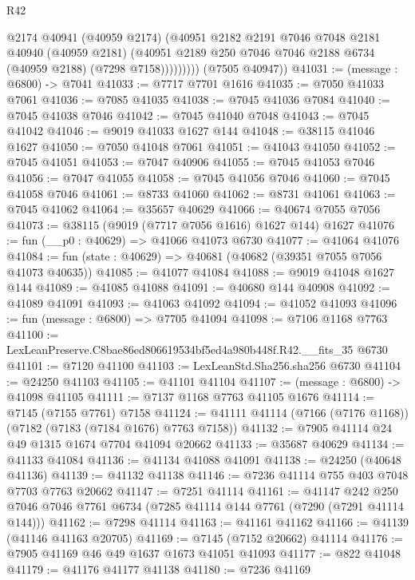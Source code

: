 \begin{lexlean}{R42}
\begin{coremodule}
{                  @2174
                  @40941
                  (@40959 @2174)
                  (@40951
                    @2182
                    @2191
                    @7046
                    @7048
                    @2181
                    @40940
                    (@40959 @2181)
                    (@40951 @2189 @250 @7046 @7046 @2188 @6734 (@40959 @2188) (@7298 @7158)))))))))
      (@7505 @40947))
@41031 := (message : @6800) -> @7041
@41033 := @7717 @7701 @1616
@41035 := @7050 @41033 @7061
@41036 := @7085 @41035
@41038 := @7045 @41036 @7084
@41040 := @7045 @41038 @7046
@41042 := @7045 @41040 @7048
@41043 := @7045 @41042
@41046 := @9019 @41033 @1627 @144
@41048 := @38115 @41046 @1627
@41050 := @7050 @41048 @7061
@41051 := @41043 @41050
@41052 := @7045 @41051
@41053 := @7047 @40906
@41055 := @7045 @41053 @7046
@41056 := @7047 @41055
@41058 := @7045 @41056 @7046
@41060 := @7045 @41058 @7046
@41061 := @8733 @41060
@41062 := @8731 @41061
@41063 := @7045 @41062
@41064 := @35657 @40629
@41066 := @40674 @7055 @7056
@41073 := @38115 (@9019 (@7717 @7056 @1616) @1627 @144) @1627
@41076 := fun (__p0 : @40629) => @41066 @41073 @6730
@41077 := @41064 @41076
@41084 := fun (state : @40629) => @40681 (@40682 (@39351 @7055 @7056 @41073 @40635))
@41085 := @41077 @41084
@41088 := @9019 @41048 @1627 @144
@41089 := @41085 @41088
@41091 := @40680 @144 @40908
@41092 := @41089 @41091
@41093 := @41063 @41092
@41094 := @41052 @41093
@41096 := fun (message : @6800) => @7705 @41094
@41098 := @7106 @1168 @7763
@41100 := LexLeanPreserve.C8bae86ed806619534bf5ed4a980b448f.R42.__fits_35 @6730
@41101 := @7120 @41100
@41103 := LexLeanStd.Sha256.sha256 @6730
@41104 := @24250 @41103
@41105 := @41101 @41104
@41107 := (message : @6800) -> @41098 @41105
@41111 := @7137 @1168 @7763 @41105 @1676
@41114 := @7145 (@7155 @7761) @7158
@41124 := @41111 @41114 (@7166 (@7176 @1168)) (@7182 (@7183 (@7184 @1676) @7763 @7158))
@41132 := @7905 @41114 @24 @49 @1315 @1674 @7704 @41094 @20662
@41133 := @35687 @40629
@41134 := @41133 @41084
@41136 := @41134 @41088 @41091
@41138 := @24250 (@40648 @41136)
@41139 := @41132 @41138
@41146 := @7236 @41114 @755 @403 @7048 @7703 @7763 @20662
@41147 := @7251 @41114
@41161 := @41147
    @242
    @250
    @7046
    @7046
    @7761
    @6734
    (@7285 @41114 @144 @7761 (@7290 (@7291 @41114 @144)))
@41162 := @7298 @41114
@41163 := @41161 @41162
@41166 := @41139 (@41146 @41163 @20705)
@41169 := @7145 (@7152 @20662) @41114
@41176 := @7905 @41169 @46 @49 @1637 @1673 @41051 @41093
@41177 := @822 @41048
@41179 := @41176 @41177 @41138
@41180 := @7236 @41169
}
\end{coremodule}
\end{lexlean}
